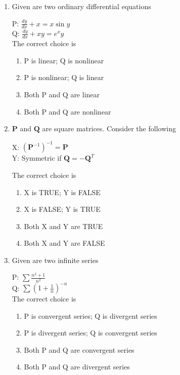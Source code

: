 \documentclass[journal,12pt,onecolumn]{IEEEtran}
\theoremstyle{remark}
\begin{document}
\begin{enumerate}[start=1, label={Q\arabic*.}]
\begin{figure}
\end{figure}
\item Given are two ordinary differential equations 

P: $\frac{dy}{dx} + x = x \sin y$ \\
Q: $\frac{dy}{dx} + x y = e^{x} y$ \\

The correct choice is

\begin{enumerate}[label=(\Alph*)]
\item P is linear; Q is nonlinear
\item P is nonlinear; Q is linear
\item Both P and Q are linear
\item Both P and Q are nonlinear
\end{enumerate}
\hfill{}

\item $\mathbf{P}$ and $\mathbf{Q}$ are square matrices. Consider the following

X: $(\mathbf{P}^{-1})^{-1} = \mathbf{P}$ \\
Y: Symmetric if $\mathbf{Q} = -\mathbf{Q}^T$

The correct choice is

\begin{enumerate}[label=(\Alph*)]
\item X is TRUE; Y is FALSE
\item X is FALSE; Y is TRUE
\item Both X and Y are TRUE
\item Both X and Y are FALSE
\end{enumerate}
\hfill{}
\item Given are two infinite series 

P: $\sum \frac{n^2 + 1}{n^2}$ \\
Q: $\sum \left( 1 + \frac{1}{n} \right)^{-n}$ \\

The correct choice is

\begin{enumerate}[label=(\Alph*)]
\item P is convergent series; Q is divergent series
\item P is divergent series; Q is convergent series
\item Both P and Q are convergent series
\item Both P and Q are divergent series
\end{enumerate}
\hfill{}


\end{enumerate}
\end{document}
